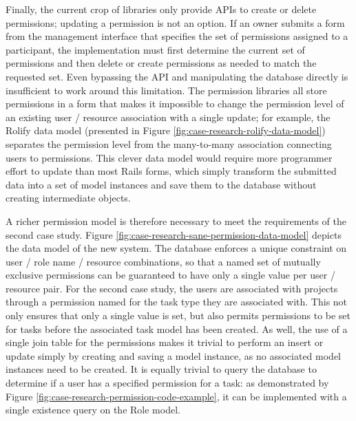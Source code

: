 \documentclass[document.tex]{subfiles}
\begin{document}
Finally, the current crop of libraries only provide APIs to create or delete permissions; updating a permission is not an option.
If an owner submits a form from the management interface that specifies the set of permissions assigned to a participant, the implementation must first determine the current set of permissions and then delete or create permissions as needed to match the requested set.
Even bypassing the API and manipulating the database directly is insufficient to work around this limitation.
The permission libraries all store permissions in a form that makes it impossible to change the permission level of an existing user / resource association with a single update; for example, the Rolify data model (presented in Figure \ref{fig:case-research-rolify-data-model}) separates the permission level from the many-to-many association connecting users to permissions.
This clever data model would require more programmer effort to update than most Rails forms, which simply transform the submitted data into a set of model instances and save them to the database without creating intermediate objects.

A richer permission model is therefore necessary to meet the requirements of the second case study.
Figure \ref{fig:case-research-sane-permission-data-model} depicts the data model of the new system.
The database enforces a unique constraint on user / role name / resource combinations, so that a named set of mutually exclusive permissions can be guaranteed to have only a single value per user / resource pair.
For the second case study, the users are associated with projects through a permission named for the task type they are associated with.
This not only ensures that only a single value is set, but also permits permissions to be set for tasks before the associated task model has been created.
As well, the use of a single join table for the permissions makes it trivial to perform an insert or update simply by creating and saving a model instance, as no associated model instances need to be created.
It is equally trivial to query the database to determine if a user has a specified permission for a task: as demonstrated by Figure \ref{fig:case-research-permission-code-example}, it can be implemented with a single existence query on the Role model.
\end{document}
